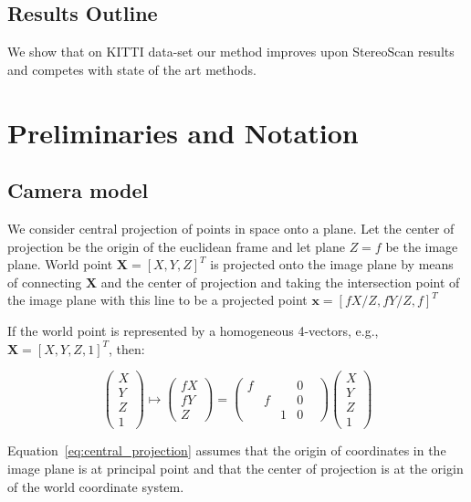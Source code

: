 \documentclass{bmvc2k}
\begin{document}
\subsection{Results Outline}

We show that on KITTI data-set our method improves upon StereoScan\cite{Geiger2011}
results and competes with state of the art methods.

\section{Preliminaries and Notation}

\subsection{Camera model}

We consider central projection of points in space onto a plane. Let
the center of projection be the origin of the euclidean frame and let
plane $Z=f$ be the image plane. World point $\mathbf{X}=[X,Y,Z]^T$ is
projected onto the image plane by means of connecting $\mathbf{X}$ and
the center of projection and taking the intersection point of the
image plane with this line to be a projected point
$\mathbf{x}=[fX/Z,fY/Z,f]^T$


If the world point is represented by a homogeneous 4-vectors, e.g.,
$\mathbf{X} = [X,Y,Z,1]^T$, then:

\begin{equation}\label{eq:central_projection}
\begin{pmatrix}
X\\ Y\\ Z\\ 1
\end{pmatrix}
\mapsto
\begin{pmatrix}
fX\\ fY\\ Z
\end{pmatrix}
=
\begin{pmatrix}
f& & &0& \\
 &f& &0& \\
 & &1&0&
\end{pmatrix}
\begin{pmatrix}
X\\ Y\\ Z\\ 1
\end{pmatrix}
\end{equation}

Equation~\ref{eq:central_projection} assumes that the origin of coordinates in
the image plane is at principal point and that the center of
projection is at the origin of the world coordinate system.
\end{document}
